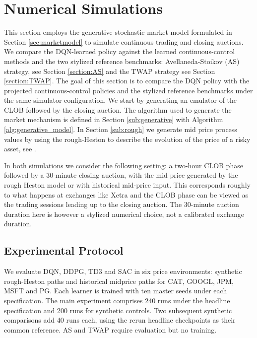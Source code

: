 \documentclass[11pt]{article}
\begin{document}
\section{Numerical Simulations}
\label{sec:numerics}

This section employs the generative stochastic market model formulated in Section \ref{sec:marketmodel} to simulate continuous trading and closing auctions. We compare the DQN-learned policy against the learned continuous-control methods and the two stylized reference benchmarks: Avellaneda-Stoikov (AS) strategy, see Section \ref{section:AS} and the TWAP strategy see Section \ref{section:TWAP}.  The goal of this section is to compare the DQN policy with the projected continuous-control policies and the stylized reference benchmarks under the same simulator configuration. We start by generating an emulator of the CLOB followed by the closing auction. The algorithm used to generate the market mechanism is defined in Section \ref{sub:generative} with Algorithm \ref{alg:generative_model}. In Section \ref{sub:rough} we generate mid price process values by using the rough-Heston to describe the evolution of the price of a risky asset, see \cite{gatheral2022volatility}.\vspace{0.5em}

In both simulations we consider the following setting: a two-hour CLOB phase followed by a 30-minute closing auction, with the mid price generated by the rough Heston model or with historical mid-price input. This corresponds roughly to what happens at exchanges like Xetra and the CLOB phase can be viewed as the trading sessions leading up to the closing auction. The 30-minute auction duration here is however a stylized numerical choice, not a calibrated exchange duration.

\begingroup
\subsection{Experimental Protocol}
\label{subsec:experimental_protocol}
We evaluate DQN, DDPG, TD3 and SAC in six price environments: synthetic rough-Heston paths and historical midprice paths for CAT, GOOGL, JPM, MSFT and PG. Each learner is trained with ten master seeds under each specification. The main experiment comprises 240 runs under the headline specification and 200 runs for synthetic controls. Two subsequent synthetic comparisons add 40 runs each, using the rerun headline checkpoints as their common reference. AS and TWAP require evaluation but no training.\vspace{0.5em}
\end{document}
